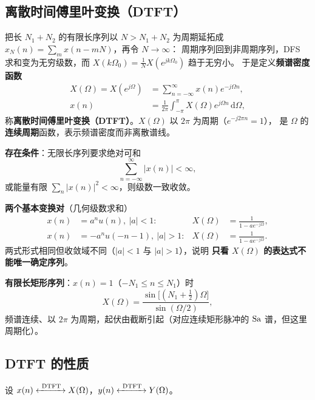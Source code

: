 \subsection{离散时间傅里叶变换（DTFT）}

把长 $N_1+N_2$ 的有限长序列以 $N>N_1+N_2$ 为周期延拓成 $x_N(n)=\sum_m x(n-mN)$，再令 $N\to\infty$：
周期序列回到非周期序列，DFS 求和变为无穷级数，而 $X(k\Omega_0)=\frac{1}{N}X(e^{jk\Omega_0})$ 趋于无穷小。
于是定义\textbf{频谱密度函数}
\begin{align}
X(\Omega)=X(e^{j\Omega})&=\sum_{n=-\infty}^{\infty}x(n)e^{-j\Omega n},\\
x(n)&=\frac{1}{2\pi}\int_{-\pi}^{\pi}X(\Omega)e^{j\Omega n}\,\mathrm{d}\Omega ,
\end{align}
称\textbf{离散时间傅里叶变换（DTFT）}。$X(\Omega)$ 以 $2\pi$ 为周期（$e^{-j2\pi n}=1$），
是 $\Omega$ 的\textbf{连续周期}函数，表示频谱密度而非离散谱线。

\textbf{存在条件}：无限长序列要求绝对可和
\begin{equation}
\sum_{n=-\infty}^{\infty}\big|x(n)\big|<\infty,
\end{equation}
或能量有限 $\sum_n|x(n)|^2<\infty$，则级数一致收敛。

\textbf{两个基本变换对}（几何级数求和）
\begin{align}
x(n)&=a^n u(n),\ |a|<1: & X(\Omega)&=\frac{1}{1-ae^{-j\Omega}},\\
x(n)&=-a^n u(-n-1),\ |a|>1: & X(\Omega)&=\frac{1}{1-ae^{-j\Omega}}.
\end{align}
两式形式相同但收敛域不同（$|a|<1$ 与 $|a|>1$），说明
\textbf{只看 $X(\Omega)$ 的表达式不能唯一确定序列}。

\textbf{有限长矩形序列}：$x(n)=1$（$-N_1\le n\le N_1$）时
\begin{equation}
X(\Omega)=\frac{\sin\!\big[(N_1+\tfrac12)\Omega\big]}{\sin(\Omega/2)},
\end{equation}
频谱连续、以 $2\pi$ 为周期，起伏由截断引起（对应连续矩形脉冲的 $\operatorname{Sa}$ 谱，但这里周期化）。

\subsection{DTFT 的性质}

设 $x(n)\xleftrightarrow{\ \mathrm{DTFT}\ }X(\Omega)$，$y(n)\xleftrightarrow{\ \mathrm{DTFT}\ }Y(\Omega)$。

